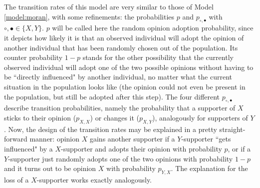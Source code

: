 \documentclass[12pt,a4paper,twoside]{article}
\begin{document}
The transition rates of this model are very similar to those of Model \ref{model:moran}, with some refinements: the probabilities $p$ and $p_{\circ,\bullet}$ with $\circ,\bullet \in \lbrace X,Y\rbrace$. $p$ will be called here the random opinion adoption probability, since it depicts how likely it is that an observed individual will adopt the opinion of another individual that has been randomly chosen out of the population. Its counter probability $1-p$ stands for the other possibility that the currently observed individual will adopt one of the two possible opinions without having to be ``directly influenced" by another individual, no matter what the current situation in the population looks like (the opinion could not even be present in the population, but still be adopted after this step). The four different $p_{\circ ,\bullet}$ describe transition probabilities, namely the probability that a supporter of $X$ sticks to their opinion ($p_{X, X}$) or changes it ($p_{X, Y}$), analogously for supporters of $Y$. Now, the design of the transition rates may be explained in a pretty straight-forward manner: opinion $X$ gains another supporter if a $Y$-supporter ``gets influenced" by a $X$-supporter and adopts their opinion with probability $p$, or if a $Y$-supporter just randomly adopts one of the two opinions with probability $1-p$ and it turns out to be opinion $X$ with probability $p_{Y, X}$. The explanation for the loss of a $X$-supporter works exactly analogously.
\end{document}
